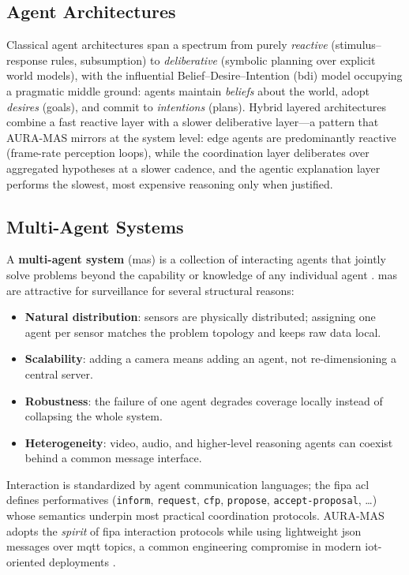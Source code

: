 \subsection{Agent Architectures}

Classical agent architectures span a spectrum from purely \emph{reactive} (stimulus--response rules, subsumption) to \emph{deliberative} (symbolic planning over explicit world models), with the influential Belief--Desire--Intention (\gls{bdi}) model \cite{rao1995bdi} occupying a pragmatic middle ground: agents maintain \emph{beliefs} about the world, adopt \emph{desires} (goals), and commit to \emph{intentions} (plans). Hybrid layered architectures combine a fast reactive layer with a slower deliberative layer---a pattern that AURA-MAS mirrors at the system level: edge agents are predominantly reactive (frame-rate perception loops), while the coordination layer deliberates over aggregated hypotheses at a slower cadence, and the agentic explanation layer performs the slowest, most expensive reasoning only when justified.

\subsection{Multi-Agent Systems}

A \textbf{multi-agent system} (\gls{mas}) is a collection of interacting agents that jointly solve problems beyond the capability or knowledge of any individual agent \cite{wooldridge2009introduction}. \gls{mas} are attractive for surveillance for several structural reasons:

\begin{itemize}
    \item \textbf{Natural distribution}: sensors are physically distributed; assigning one agent per sensor matches the problem topology and keeps raw data local.
    \item \textbf{Scalability}: adding a camera means adding an agent, not re-dimensioning a central server.
    \item \textbf{Robustness}: the failure of one agent degrades coverage locally instead of collapsing the whole system.
    \item \textbf{Heterogeneity}: video, audio, and higher-level reasoning agents can coexist behind a common message interface.
\end{itemize}

Interaction is standardized by agent communication languages; the \gls{fipa} \gls{acl} defines performatives (\texttt{inform}, \texttt{request}, \texttt{cfp}, \texttt{propose}, \texttt{accept-proposal}, \ldots) whose semantics underpin most practical coordination protocols. AURA-MAS adopts the \emph{spirit} of \gls{fipa} interaction protocols while using lightweight \gls{json} messages over \gls{mqtt} topics, a common engineering compromise in modern \gls{iot}-oriented deployments \cite{light2017mosquitto}.


